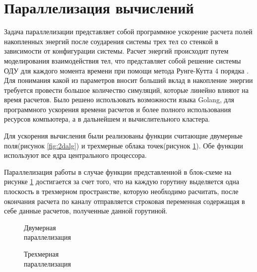 \section{Параллелизация вычислений}

Задача параллелизации представляет собой программное ускорение расчета полей накопленных энергий после соударения системы трех тел со стенкой в зависимости
от конфигурации системы. Расчет энергий происходит путем моделирования взаимодействия тел, что представляет собой решение системы ОДУ для каждого момента
времени при помощи метода Рунге-Кутта 4 порядка \cite{BahvalJidkovKobel1987}. Для понимания какой из параметров вносит больший вклад в накопление энергии 
требуется провести большое количество симуляций, которые линейно влияют на время расчетов. Было решено использовать возможности языка Golang, для программного
ускорения времени расчетов и более полного использования ресурсов компьютера, а в дальнейшем и вычислительного кластера.

Для ускорения вычисления были реализованы функции считающие двумерные поля(рисунок \ref{fig:2dalg}) и трехмерные облака точек(рисунок \ref{fig:3dalg}).
Обе функции используют все ядра центрального процессора.


Параллелизация работы в случае функции представленной в блок-схеме на рисунке \ref{fig:3dalg} достигается за счет того, что на каждую горутину выделяется одна плоскость в трехмерном пространстве, 
которую необходимо расчитать, после окончания расчета по каналу отправляется строковая переменная содержащая в себе данные расчетов, полученные данной горутиной.


\begin{figure}[!h]
    \centering
    \begin{minipage}[h]{0.49\linewidth}
        \centering
        \scalebox{0.45}{}
        \caption{Двумерная\\параллелизация}
        \label{fig:2dalg}
    \end{minipage}
    \begin{minipage}[h]{0.49\linewidth}
        \centering
        \scalebox{0.45}{}
        \caption{Трехмерная\\параллелизация}
        \label{fig:3dalg}
    \end{minipage}
\end{figure}

